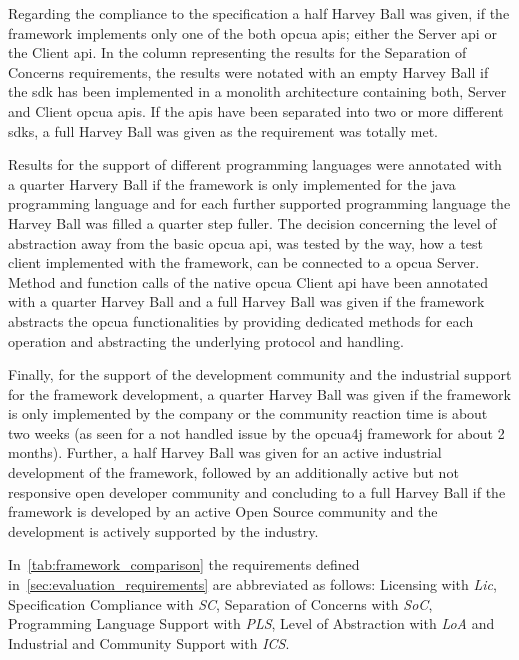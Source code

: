 \documentclass[
a4paper,
twoside,
headsepline,
cleardoublepage=empty,
parskip=half,
draft=false
]{scrbook}
\begin{document}
			Regarding the compliance to the specification a half Harvey Ball was given, if the framework implements only one of the both \gls{opcua} \gls{api}s; either the Server \gls{api} or the Client \gls{api}.
			In the column representing the results for the Separation of Concerns requirements, the results were notated with an empty Harvey Ball if the \gls{sdk} has been implemented in a monolith architecture containing both, Server and Client \gls{opcua} \gls{api}s. If the \gls{api}s have been separated into two or more different \gls{sdk}s, a full Harvey Ball was given as the requirement was totally met.
			
			Results for the support of different programming languages were annotated with a quarter Harvery Ball if the framework is only implemented for the \gls{java} programming language and for each further supported programming language the Harvey Ball was filled a quarter step fuller.
			The decision concerning the level of abstraction away from the basic \gls{opcua} \gls{api}, was tested by the way, how a test client implemented with the framework, can be connected to a \gls{opcua} Server. Method and function calls of the native \gls{opcua} Client \gls{api} have been annotated with a quarter Harvey Ball and a full Harvey Ball was given if the framework abstracts the \gls{opcua} functionalities by providing dedicated methods for each operation and abstracting the underlying protocol and handling.
			
			Finally, for the support of the development community and the industrial support for the framework development, a quarter Harvey Ball was given if the framework is only implemented by the company or the community reaction time is about two weeks (as seen for a not handled issue by the opcua4j framework for about 2 months). Further, a half Harvey Ball was given for an active industrial development of the framework, followed by an additionally active but not responsive open developer community and concluding to a full Harvey Ball if the framework is developed by an active Open Source community and the development is actively supported by the industry. 
			
			In~\cref{tab:framework_comparison} the requirements defined in~\cref{sec:evaluation_requirements} are abbreviated as follows: Licensing with \textit{Lic}, Specification Compliance with \textit{SC}, Separation of Concerns with \textit{SoC}, Programming Language Support with \textit{PLS}, Level of Abstraction with \textit{LoA} and Industrial and Community Support with \textit{ICS}.
			
\end{document}

